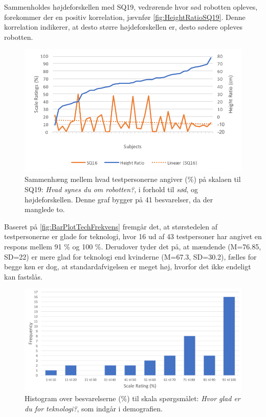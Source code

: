 \noindent
%
Sammenholdes højdeforskellen med SQ19, vedrørende hvor sød robotten opleves, forekommer der en positiv korrelation, jævnfør \autoref{fig:HeightRatioSQ19}. Denne korrelation indikerer, at desto større højdeforskellen er, desto sødere opleves robotten. 
%
\begin{figure}[H]
\centering
\includegraphics[width=\textwidth]{Figure/DatabehandlingSkalaer/Demografi/HeightRatioSQ19}
\caption{Sammenhæng mellem hvad testpersonerne angiver (\%) på skalaen til SQ19: \textit{Hvad synes du om robotten?}, i forhold til \textit{sød}, og højdeforskellen. Denne graf bygger på 41 besvarelser, da der manglede to.}
\label{fig:HeightRatioSQ19}
\end{figure}
\noindent
%
Baseret på \autoref{fig:BarPlotTechFrekvens} fremgår det, at størstedelen af testpersonerne er glade for teknologi, hvor 16 ud af 43 testpersoner har angivet en respons mellem 91 \% og 100 \%. Derudover tyder det på, at mændende (M=76.85, SD=22) er mere glad for teknologi end kvinderne (M=67.3, SD=30.2), fælles for begge køn er dog, at standardafvigelsen er meget høj, hvorfor det ikke endeligt kan fastslås. 
%
\begin{figure}[H]
\centering
\includegraphics[width = \textwidth]{Figure/DatabehandlingSkalaer/DataPresentation/HistogramTek} 
\caption{Histogram over besvarelserne (\%) til skala spørgsmålet: \textit{Hvor glad er du for teknologi?}, som indgår i demografien.}
\label{fig:HistogramTek}
\end{figure}
